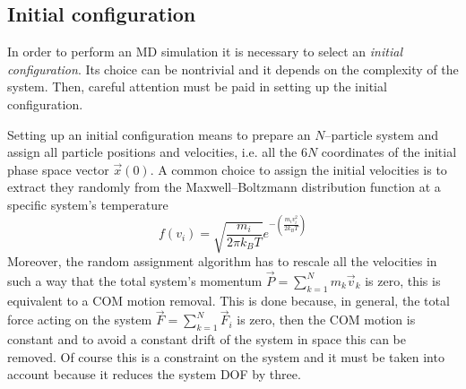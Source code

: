 \subsection{Initial configuration}
In order to perform an \ac{MD} simulation it is necessary to select an \textit{initial configuration}. Its
choice can be nontrivial and it depends on the complexity of the system. Then, careful attention must be paid in
setting up the initial configuration.

Setting up an initial configuration means to prepare an $N$--particle system and assign all particle positions
and velocities, i.e. all the $6N$ coordinates of the initial phase space vector $\vec x(0)$. A common choice to
assign the initial velocities is to extract they randomly from the Maxwell--Boltzmann distribution function at a
specific system's temperature
\begin{equation*}
	f(v_i) = \sqrt{\frac{m_i}{2\pi k_B T}}e^{-\left ( \frac{m_iv_i^2}{2k_B T}\right )}
\end{equation*}
Moreover, the random assignment algorithm has to rescale all the velocities in such a way that the total system's
momentum $\vec P = \sum_{k=1}^N m_k\vec v_k$ is zero, this is equivalent to a \ac{COM} motion removal. This is
done because, in general, the total force acting on the system $\vec F = \sum_{k=1}^N \vec F_i$ is zero, then the
\ac{COM} motion is constant and to avoid a constant drift of the system in space this can be removed. Of course
this is a constraint on the system and it must be taken into account because it reduces the system \ac{DOF} by
three.

